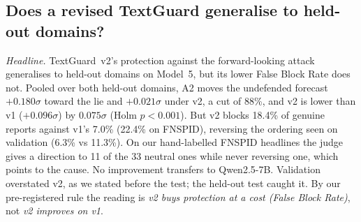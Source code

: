 
\subsection{Does a revised TextGuard generalise to held-out domains?}
\label{sec:r4}

\emph{Headline.} TextGuard~v2's protection against the forward-looking attack generalises to
held-out domains on Model~5, but its lower False Block Rate does not. Pooled over both held-out
domains, A2 moves the undefended forecast $+0.180\sigma$ toward the lie and $+0.021\sigma$ under
v2, a cut of 88\%, and v2 is lower than v1 ($+0.096\sigma$) by $0.075\sigma$ (Holm $p < 0.001$).
But v2 blocks 18.4\% of genuine reports against v1's 7.0\% (22.4\% on FNSPID), reversing the
ordering seen on validation (6.3\% vs 11.3\%). On our hand-labelled FNSPID headlines the judge
gives a direction to 11 of the 33 neutral ones while never reversing one, which points to the
cause. No improvement transfers to Qwen2.5-7B. Validation overstated v2, as we stated before the
test; the held-out test caught it. By our pre-registered rule the reading is \emph{v2 buys
protection at a cost (False Block Rate)}, not \emph{v2 improves on v1}.

